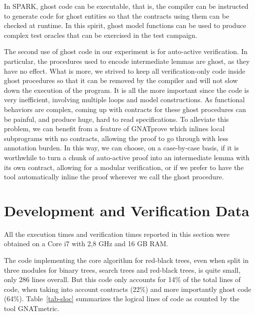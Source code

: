 \documentclass{llncs}
\newcommand{\gnatprove}{GNATprove\xspace}
\begin{document}
In SPARK, ghost code can be executable, that is, the compiler can be instructed to generate code for ghost
entities so that the contracts using them can be checked at runtime. In this spirit, ghost model functions
can be used to produce complex test oracles that can be exercised in the test campaign.

The second use of ghost code in our experiment is for auto-active verification. In particular, the procedures
used to encode intermediate lemmas are ghost, as they have no effect. What is more, we strived to
keep all verification-only code inside ghost procedures so that it can be removed by the compiler and will not
slow down the execution of the program. It is all the more important since the code is very inefficient, involving
multiple loops and model constructions. As functional behaviors are complex, coming up with contracts for
these ghost procedures can be painful, and produce huge, hard to read specifications. To alleviate this
problem, we can benefit from a feature of \gnatprove which inlines local subprograms with no contracts, allowing
the proof to go through with less annotation burden. In this way, we can choose, on a case-by-case basis, if
it is worthwhile to turn a chunk of auto-active proof into an intermediate lemma with its own contract,
allowing for a modular verification, or if we prefer to have the tool automatically inline the
proof wherever we call the ghost procedure.


\section{Development and Verification Data}

All the execution times and verification times reported in this section were
obtained on a Core i7 with 2,8 GHz and 16 GB RAM.

The code implementing the core algorithm for red-black trees, even when split
in three modules for binary trees, search trees and red-black trees, is quite
small, only 286 lines overall. But this code only accounts for 14\% of the
total lines of code, when taking into account contracts (22\%) and more
importantly ghost code (64\%). Table~\ref{tab-sloc} summarizes the logical
lines of code as counted by the tool GNATmetric.
\end{document}
